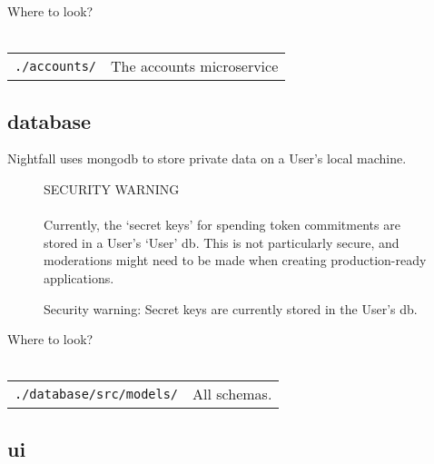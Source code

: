 \begin{center}
  \begin{mdframed}[backgroundcolor=verylightblue]
    Where to look?\\
    \\
    \begin{tabular}{lp{14cm}}
      \texttt{./accounts/} & The accounts microservice\\
    \end{tabular}
  \end{mdframed}
\end{center}

\subsection{database}
\label{sec:database}

Nightfall uses mongodb to store private data on a User's local machine.

\begin{figure}[h]
  \begin{center}
    \begin{mdframed}[backgroundcolor=verylightred]
      \noindent
      SECURITY WARNING\\
      \\
      Currently, the `secret keys' for spending token commitments are stored in a User's `User' db. This is not particularly secure, and moderations might need to be made when creating production-ready applications.
    \end{mdframed}
  \end{center}
  \caption{Security warning: Secret keys are currently stored in the User's db.}
\end{figure}


\begin{center}
  \begin{mdframed}[backgroundcolor=verylightblue]
    Where to look?\\
    \\
    \begin{tabular}{lp{14cm}}
      \texttt{./database/src/models/} & All schemas.\\
    \end{tabular}
  \end{mdframed}
\end{center}



\subsection{ui}
\label{sec:ui}

